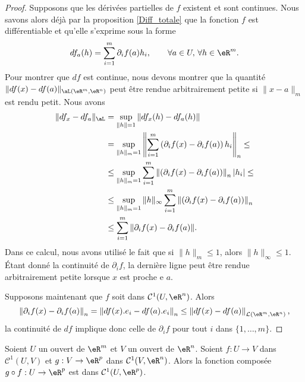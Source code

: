 \begin{proof}
	Supposons que les dérivées partielles de $f$ existent et sont continues. Nous savons alors déjà par la proposition \ref{Diff_totale} que la fonction $f$ est différentiable et qu'elle s'exprime sous la forme
	\[
		df_a(h)=\sum_{i=1}^{m}\partial_if (a)h_i, \qquad \forall a \in U,\,\forall h\in\eR^m.
	\]
	Pour montrer que $df$ est continue, nous devons montrer que la quantité $\| df(x)-df(a) \|_{\aL(\eR^m,\eR^n)}$ peut être rendue arbitrairement petite si $\| x-a \|_m$ est rendu petit. Nous avons
	\begin{equation}
		\begin{aligned}
			\| df_x-df_a \|_{\aL}&=\sup_{\| h \|=1}\| df_x(h)-df_a(h) \|\\
			&=\sup_{\| h \|_m=1}\left\|\sum_{i=1}^{m}\left(\partial_if (x)-\partial_if (a)\right)h_i\right\|_n\leq\\
			&\leq\sup_{\| h \|_m=1}\sum_{i=1}^{m} \left\|\left(\partial_if (x)-\partial_if (a)\right)\right\|_n|h_i|\leq\\
			&\leq\sup_{\| h \|_m=1} \|h\|_\infty\sum_{i=1}^{m} \left\|\left(\partial_if (x)-\partial_if (a)\right)\right\|_n\\
			&\leq \sum_{i=1}^m\| \partial_if(x)-\partial_if(a) \|.
		\end{aligned}
	\end{equation}
	Dans ce calcul, nous avons utilisé le fait que si $\| h \|_m\leq 1$, alors $\| h \|_{\infty}\leq 1$. Étant donné la continuité de $\partial_if$, la dernière ligne peut être rendue arbitrairement petite lorsque $x$ est proche e $a$.

Supposons maintenant que $f$ soit dans $\mathcal{C}^1(U,\eR^n)$. Alors 
\[
\left\|\partial_if (x)-\partial_if (a)\right\|_n= \left\|df(x).e_i-df(a).e_i\right\|_n \leq  \left\|df(x)-df(a)\right\|_{\mathcal{L}(\eR^m,\eR^n)},
\]  
la continuité de $df$ implique donc celle de $\partial_i f$ pour tout $i$ dans $\{1,\ldots,m\}$.
\end{proof}
\begin{proposition}
  Soient $U$ un ouvert de $\eR^m$ et $V$ un ouvert de $\eR^n$. Soient $f: U\to V$  dans $\mathcal{C}^1(U,V)$ et $g: V \to \eR^p$ dans $\mathcal{C}^1(V,\eR^n)$.  Alors la fonction composée $g\circ f: U\to \eR^p $ est dans $\mathcal{C}^1(U,\eR^p)$.
\end{proposition}
